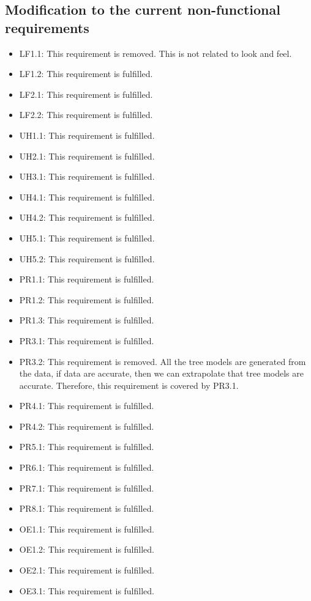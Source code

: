 \documentclass[12pt, titlepage]{article}
\begin{document}
\subsection{Modification to the current non-functional requirements}
\begin{itemize}
\item LF1.1: This requirement is removed. This is not related to look and feel.
\item LF1.2: This requirement is fulfilled.
\item LF2.1: This requirement is fulfilled.
\item LF2.2: This requirement is fulfilled.
\item UH1.1: This requirement is fulfilled.
\item UH2.1: This requirement is fulfilled.
\item UH3.1: This requirement is fulfilled.
\item UH4.1: This requirement is fulfilled.
\item UH4.2: This requirement is fulfilled.
\item UH5.1: This requirement is fulfilled.
\item UH5.2: This requirement is fulfilled.
\item PR1.1: This requirement is fulfilled.
\item PR1.2: This requirement is fulfilled.
\item PR1.3: This requirement is fulfilled.
\item PR3.1: This requirement is fulfilled.
\item PR3.2: This requirement is removed. All the tree models are generated from 
the data, if data are accurate, then we can extrapolate that tree models are 
accurate. Therefore, this requirement is covered by PR3.1.
\item PR4.1: This requirement is fulfilled.
\item PR4.2: This requirement is fulfilled.
\item PR5.1: This requirement is fulfilled.
\item PR6.1: This requirement is fulfilled.
\item PR7.1: This requirement is fulfilled.
\item PR8.1: This requirement is fulfilled.
\item OE1.1: This requirement is fulfilled.
\item OE1.2: This requirement is fulfilled.
\item OE2.1: This requirement is fulfilled.
\item OE3.1: This requirement is fulfilled.

\end{itemize}
\end{document}
